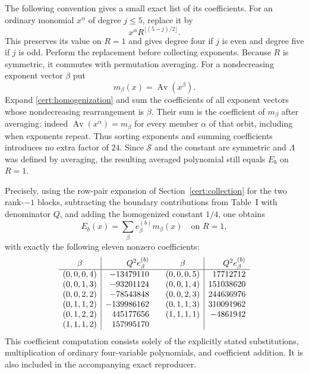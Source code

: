 The following convention gives a small exact list of its coefficients.
For an ordinary monomial $x^\alpha$ of degree $j\le5$, replace it by
\begin{equation}\label{cert:homogenization}
 x^\alpha R^{\lfloor(5-j)/2\rfloor}.
\end{equation}
This preserves its value on $R=1$ and gives degree four if $j$ is even and
degree five if $j$ is odd.  Perform the replacement before collecting
exponents.  Because $R$ is symmetric, it commutes with permutation averaging.
For a nondecreasing exponent vector $\beta$ put
\[
 m_\beta(x)=\operatorname{Av}(x^\beta).
\]
Expand \eqref{cert:homogenization} and sum the coefficients of all exponent
vectors whose nondecreasing rearrangement is $\beta$.  Their sum is the
coefficient of $m_\beta$ after averaging: indeed
$\operatorname{Av}(x^\alpha)=m_\beta$ for every member $\alpha$ of that
orbit, including when exponents repeat.  Thus sorting exponents and summing
coefficients introduces no extra factor of $24$.  Since $\mathcal S$ and
the constant are symmetric and $\Lambda$ was defined by averaging, the
resulting averaged polynomial still equals $E_b$ on $R=1$.

Precisely, using the row-pair expansion of Section~\ref{cert:collection}
for the two rank-$-1$ blocks, subtracting the boundary contributions from
Table~I with denominator $Q$, and adding the homogenized constant $1/4$,
one obtains
\begin{equation}\label{cert:boundary-expansion}
 E_b(x)=\sum_\beta e^{(b)}_\beta m_\beta(x)\quad\text{on }R=1,
\end{equation}
with exactly the following eleven nonzero coefficients:
\begin{equation}\label{cert:eleven-coefficients}
\begin{array}{c|r@{\qquad}c|r}
 \beta&Q^2 e^{(b)}_\beta&\beta&Q^2 e^{(b)}_\beta\\\hline
 (0,0,0,4)&-13479110 &(0,0,0,5)&17712712\\
 (0,0,1,3)&-93201124 &(0,0,1,4)&151038620\\
 (0,0,2,2)&-78543848 &(0,0,2,3)&244636976\\
 (0,1,1,2)&-139986162&(0,1,1,3)&310091962\\
 (0,1,2,2)&445177656 &(1,1,1,1)&-4861942\\
 (1,1,1,2)&157995170&&
\end{array}
\end{equation}
This coefficient computation consists solely of the explicitly stated
substitutions, multiplication of ordinary four-variable polynomials, and
coefficient addition.  It is also included in the accompanying exact
reproducer.

